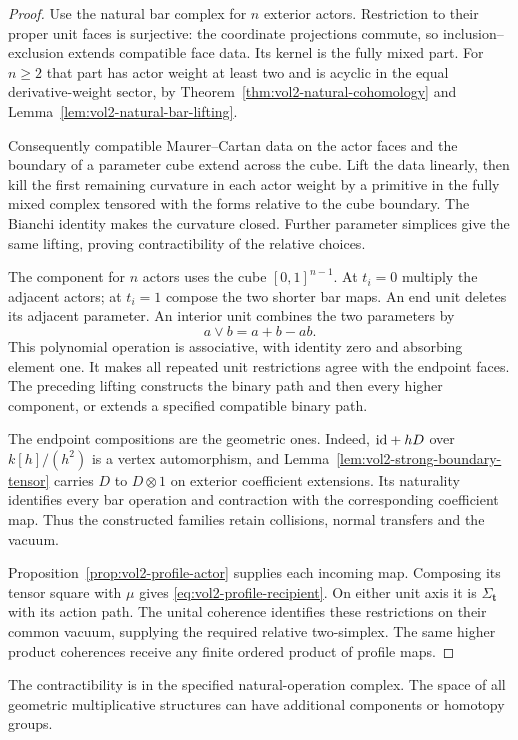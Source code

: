\begin{proof}
Use the natural bar complex for $n$ exterior actors. Restriction
to their proper unit faces is surjective: the coordinate
projections commute, so inclusion--exclusion extends compatible
face data. Its kernel is the fully mixed part. For $n\geq2$
that part has actor weight at least two and is acyclic in the
equal derivative-weight sector, by
Theorem~\ref{thm:vol2-natural-cohomology} and
Lemma~\ref{lem:vol2-natural-bar-lifting}.

Consequently compatible Maurer--Cartan data on the actor faces
and the boundary of a parameter cube extend across the cube.
Lift the data linearly, then kill the first remaining curvature
in each actor weight by a primitive in the fully mixed complex
tensored with the forms relative to the cube boundary. The
Bianchi identity makes the curvature closed. Further parameter
simplices give the same lifting, proving contractibility of
the relative choices.

The component for $n$ actors uses the cube $[0,1]^{n-1}$.
At $t_i=0$ multiply the adjacent actors; at $t_i=1$ compose
the two shorter bar maps. An end unit deletes its adjacent
parameter. An interior unit combines the two parameters by
\[
 a\vee b=a+b-ab.
\]
This polynomial operation is associative, with identity zero
and absorbing element one. It makes all repeated unit
restrictions agree with the endpoint faces. The preceding
lifting constructs the binary path and then every higher
component, or extends a specified compatible binary path.

The endpoint compositions are the geometric ones. Indeed,
$\mathrm{id}+hD$ over $k[h]/(h^2)$ is a vertex automorphism, and
Lemma~\ref{lem:vol2-strong-boundary-tensor} carries $D$ to
$D\otimes1$ on exterior coefficient extensions. Its naturality
identifies every bar operation and contraction with the
corresponding coefficient map. Thus the constructed families
retain collisions, normal transfers and the vacuum.

Proposition~\ref{prop:vol2-profile-actor} supplies each incoming
map. Composing its tensor square with $\mu$ gives
\eqref{eq:vol2-profile-recipient}. On either unit axis it is
$\Sigma_{\mathbf t}$ with its action path. The unital coherence
identifies these restrictions on their common vacuum, supplying
the required relative two-simplex. The same higher product
coherences receive any finite ordered product of profile maps.
\end{proof}

The contractibility is in the specified natural-operation
complex. The space of all geometric multiplicative structures
can have additional components or homotopy groups.

